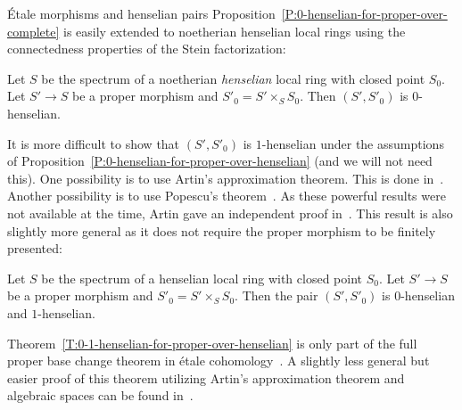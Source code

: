 \documentclass[a4paper,twoside,11pt]{amsart}[2009/07/02] %
\newcommand{\pref}[1]{\eqref{#1}}
\newcommand{\etale}{\'{e}tale}
\newcommand{\Etale}{\'{E}tale}
\begin{document}
\begin{section}{\Etale{} morphisms and henselian pairs}
Proposition~\pref{P:0-henselian-for-proper-over-complete} is easily extended
to noetherian henselian local rings using the connectedness properties of the
Stein factorization:

\begin{proposition}
\label{P:0-henselian-for-proper-over-henselian}
Let $S$ be the spectrum of a noetherian \emph{henselian} local ring with closed
point $S_0$. Let $S'\to S$ be a proper morphism and $S'_0=S'\times_S
S_0$. Then $(S',S'_0)$ is $0$-henselian.
\end{proposition}

It is more difficult to show that $(S',S'_0)$ is $1$-henselian under the
assumptions of Proposition~\pref{P:0-henselian-for-proper-over-henselian} (and
we will not need this). One possibility is to use Artin's approximation
theorem. This is done in~\cite[Thm.~3.1]{artin_alg_approximation}. Another
possibility is to use Popescu's
theorem~\cite{swan_popescus_theorem,spivakovsky_popescus_theorem}.
As these powerful results were not available at the time, Artin gave an
independent proof in~\cite[Exp.~XII]{sga4}.
This result is also slightly more general as it does not require the proper
morphism to be finitely presented:

\begin{theorem}
\label{T:0-1-henselian-for-proper-over-henselian}
Let $S$ be the spectrum of a henselian local ring with closed point $S_0$. Let
$S'\to S$ be a proper morphism and $S'_0=S'\times_S S_0$. Then the pair
$(S',S'_0)$ is $0$-henselian and $1$-henselian.
\end{theorem}

Theorem~\pref{T:0-1-henselian-for-proper-over-henselian} is only part of the
full proper base change theorem in \etale{} cohomology~\cite[Exp.~XII,
Thm.~5.1, Cor.~5.5]{sga4}.
A slightly less general but easier proof of this theorem utilizing Artin's
approximation theorem and algebraic spaces can be found
in~\cite[Ch.~VII]{artin_theoremes_de_repr}.

\end{section}

\end{document}
